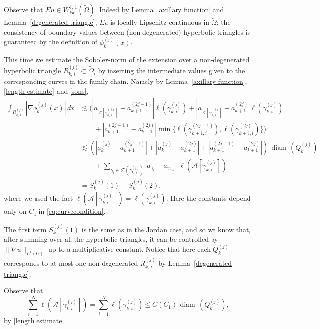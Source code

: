 \documentclass[reqno,11pt]{amsart}
\def\wz{\widetilde}
\def\diam{{\mathop\mathrm{\,diam\,}}}
\numberwithin{equation}{section}
\theoremstyle{remark}
\begin{document}
Observe that $Eu\in W^{1,\,1}_{loc}{(\wz \Omega)}.$  
Indeed by Lemma~\ref{axillary function} and  Lemma~\ref{degenerated triangle}, $Eu$ is locally Lipschitz continuous in $\wz \Omega$; the consistency of boundary values between (non-degenerated) hyperbolic triangles is guaranteed by the definition of $\phi_{k}^{(j)}(x)$. 

This time we estimate the Sobolev-norm of the extension over a non-degenerated hyperbolic triangle $R_{k,\,i}^{(j)} \subset \wz \Omega_i$
by inserting the intermediate values given to the corresponding curves in the family chain. Namely by Lemma~\ref{axillary function}, \eqref{length estimate} and \eqref{sons}, 
\begin{align*}
 \int_{R_{k,\,i}^{(j)}} |\nabla \phi_{k}^{(j)}(x)| \, dx & \lesssim 
 \bigg(|a_{\mathcal A[\gamma_{k,\,i}^{(j)}]}-a_{k+1}^{(2j-1)}|\ell(\gamma_{k,i}^{(j)})
 + |a_{\mathcal A[\gamma_{k,\,i}^{(j)}]}-a_{k+1}^{(2j)}|\ell(\gamma_{k,i}^{(j)})\\
 & \qquad+ |a_{k+1}^{(2j-1)}-a_{k+1}^{(2j)}|\min\{\ell(\gamma_{k+1,i}^{(2j-1)}),\ell(\gamma_{k+1,i}^{(2j)})\}\bigg)\\
  & \lesssim \left(|a_k^{(j)}-a_{k+1}^{(2j-1)}|+|a_k^{(j)}-a_{k+1}^{(2j)}| +|a_{k+1}^{(2j-1)}-a_{k+1}^{(2j)}|\right) \diam (Q_k^{(j)})\\
 & \qquad+ \sum_{\gamma_l\in \mathcal F(\gamma_{k,\,i}^{(j)})} |a_{\gamma_l} - a_{\gamma_{l+1}}|\ell(\mathcal A[\gamma_{k,i}^{(j)}])\\
 & = S_k^{(j)}(1) + S_k^{(j)}(2),
\end{align*}
where we used the fact $\ell(\mathcal A[\gamma_{k,i}^{(j)}])=\ell(\gamma_{k,i}^{(j)})$.  Here the constants depend only on $C_1$ in \eqref{eq:curvecondition}. 


The first term $S_k^{(j)}(1)$ is the same as in the Jordan case, and so we know 
that, after summing over all the hyperbolic triangles, it can be controlled by 
$\|\nabla u\|_{L^{1}(\Omega)}$ up to a multiplicative constant. Notice that here each $Q_k^{(j)}$ corresponds to at most one non-degenerated $R_{k,\,i}^{(j)}$ by Lemma~\ref{degenerated triangle}. 

Observe that
\begin{equation}\label{equ 61}
 \sum_{i=1}^N \ell(\mathcal A[\gamma_{k,i}^{(j)}]) =\sum_{i=1}^N \ell(\gamma_{k,i}^{(j)}) \le C(C_1) \diam (Q_k^{(j)}), 
\end{equation}
by \eqref{length estimate}. 
\end{document}
